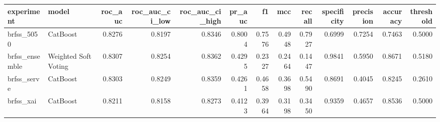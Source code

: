 \begin{tabular}{llrrrrrrrrrrr}
\toprule
experiment & model & roc\_auc & roc\_auc\_ci\_low & roc\_auc\_ci\_high & pr\_auc & f1 & mcc & recall & specificity & precision & accuracy & threshold \\
\midrule
brfss\_5050 & CatBoost & 0.8276 & 0.8197 & 0.8346 & 0.8004 & 0.7576 & 0.4948 & 0.7927 & 0.6999 & 0.7254 & 0.7463 & 0.5000 \\
brfss\_ensemble & Weighted Soft Voting & 0.8307 & 0.8254 & 0.8362 & 0.4295 & 0.2327 & 0.2464 & 0.1447 & 0.9841 & 0.5950 & 0.8671 & 0.5180 \\
brfss\_serve & CatBoost & 0.8303 & 0.8249 & 0.8359 & 0.4261 & 0.4658 & 0.3698 & 0.5490 & 0.8691 & 0.4045 & 0.8245 & 0.2610 \\
brfss\_xai & CatBoost & 0.8211 & 0.8158 & 0.8273 & 0.4123 & 0.3964 & 0.3198 & 0.3450 & 0.9359 & 0.4657 & 0.8536 & 0.5000 \\
\bottomrule
\end{tabular}
